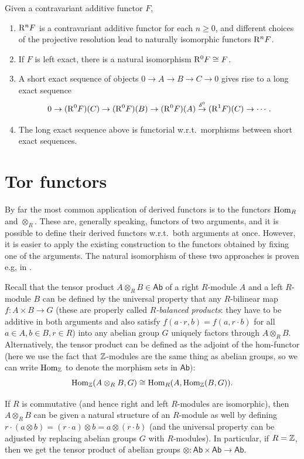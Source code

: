 \begin{thm}
    Given a contravariant additive functor $F$, 
    \begin{enumerate}
        \item $\mathrm{R}^nF$ is a contravariant additive functor for each $n\geq 0$, and different choices of the projective resolution lead to naturally isomorphic functors $\mathrm{R}^nF$.
        \item If $F$ is left exact, there is a natural isomorphism $\mathrm{R}^0F\cong F$.
        \item A short exact sequence of objects $0\to A\to B\to C\to 0$ gives rise to a long exact sequence
        \[0\to (\mathrm{R}^0F)(C)\to (\mathrm{R}^0F)(B)\to (\mathrm{R}^0F)(A)\overset{\delta^0}{\to} (\mathrm{R}^1F)(C)\to \cdots.\]
        \item The long exact sequence above is functorial w.r.t.\ morphisms between short exact sequences.
    \end{enumerate}
\end{thm}




\section{Tor functors}

By far the most common application of derived functors is to the functors $\operatorname{Hom}_R$ and $\otimes_R$. These are, generally speaking, functors of two arguments, and it is possible to define their derived functors w.r.t.\ both arguments at once. However, it is easier to apply the existing construction to the functors obtained by fixing one of the arguments. The natural isomorphism of these two approaches is proven e.g, in \cite{Rotman}.

Recall that the tensor product $A\otimes_R B \in \mathsf{Ab}$ of a right $R$-module $A$ and a left $R$-module $B$ can be defined by the universal property that any $R$-bilinear map $f:A\times B\to G$ (these are properly called \emph{$R$-balanced products}: they have to be additive in both arguments and also satisfy $f(a\cdot r,b)=f(a,r\cdot b)$ for all $a\in A,b\in B,r\in R$) into any abelian group $G$ uniquely factors through $A\otimes_R B$. Alternatively, the tensor product can be defined as the adjoint of the hom-functor (here we use the fact that $\mathbb{Z}$-modules are the same thing as abelian groups, so we can write $\operatorname{Hom}_{\mathbb{Z}}$ to denote the morphism sets in $\mathsf{Ab})$:
\[\operatorname{Hom}_{\mathbb{Z}}(A\otimes_R B,G)\cong \operatorname{Hom}_R(A,\operatorname{Hom}_{\mathbb{Z}}(B,G)).\]

If $R$ is commutative (and hence right and left $R$-modules are isomorphic), then $A\otimes_R B$ can be given a natural structure of an $R$-module as well by defining $r\cdot(a\otimes b)=(r\cdot a)\otimes b=a\otimes (r\cdot b)$ (and the universal property can be adjusted by replacing abelian groups $G$ with $R$-modules).  In particular, if $R=\mathbb{Z}$, then we get the tensor product of abelian groups $\otimes:\mathsf{Ab}\times \mathsf{Ab}\to \mathsf{Ab}$.

